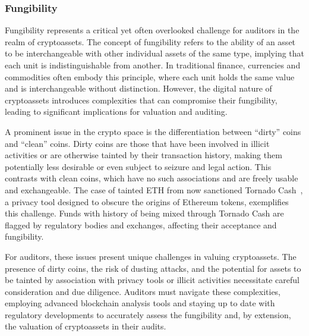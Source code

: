 \subsubsection{Fungibility}\label{fungibility}
Fungibility represents a critical yet often overlooked challenge for auditors in the realm of cryptoassets. The concept of fungibility refers to the ability of an asset to be interchangeable with other individual assets of the same type, implying that each unit is indistinguishable from another. In traditional finance, currencies and commodities often embody this principle, where each unit holds the same value and is interchangeable without distinction. However, the digital nature of cryptoassets introduces complexities that can compromise their fungibility, leading to significant implications for valuation and auditing.

A prominent issue in the crypto space is the differentiation between ``dirty'' coins and ``clean'' coins. Dirty coins are those that have been involved in illicit activities or are otherwise tainted by their transaction history, making them potentially less desirable or even subject to seizure and legal action. This contrasts with clean coins, which have no such associations and are freely usable and exchangeable. The case of tainted ETH from now sanctioned Tornado Cash~\cite{ofactornadocash,pertsev2019tornado}, a privacy tool designed to obscure the origins of Ethereum tokens, exemplifies this challenge. Funds with history of being mixed through Tornado Cash are flagged by regulatory bodies and exchanges, affecting their acceptance and fungibility. 


For auditors, these issues present unique challenges in valuing cryptoassets. The presence of dirty coins, the risk of dusting attacks, and the potential for assets to be tainted by association with privacy tools or illicit activities necessitate careful consideration and due diligence. Auditors must navigate these complexities, employing advanced blockchain analysis tools and staying up to date with regulatory developments to accurately assess the fungibility and, by extension, the valuation of cryptoassets in their audits.



